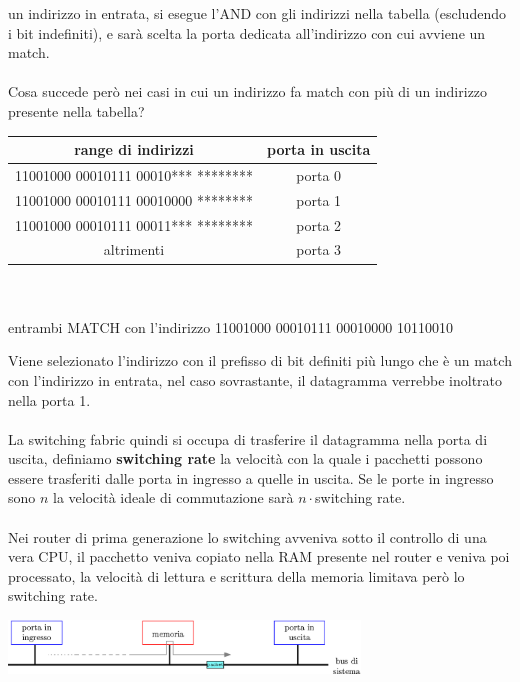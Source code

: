 \documentclass[12pt, letterpaper]{article}
\newcommand{\acc}{\\\hphantom{}\\}
\begin{document}
un indirizzo in entrata, si esegue l'AND con gli indirizzi nella tabella (escludendo i bit indefiniti), e sarà scelta 
la porta dedicata all'indirizzo con cui avviene un match. \acc 
Cosa succede però nei casi in cui un indirizzo fa match con più di un indirizzo presente nella tabella?
\begin{center}
    \begin{tabular}{|c|c|}
        \hline
        \rowcolor[HTML]{C0C0C0} 
        \textbf{range di indirizzi}                                   & \textbf{porta in uscita}        \\ \hline
        \rowcolor[HTML]{FFFFFF} 
        {\color[HTML]{FE0000} 11001000  00010111  00010***  ********} & \cellcolor[HTML]{FFFFFF}porta 0 \\ \hline
        \rowcolor[HTML]{FFFFFF} 
        {\color[HTML]{FE0000} 11001000  00010111  00010000  ********} & porta 1                         \\ \hline
        \rowcolor[HTML]{FFFFFF} 
        {\color[HTML]{000000} 11001000  00010111  00011***  ********} & \cellcolor[HTML]{FFFFFF}porta 2 \\ \hline
        altrimenti                                                    & porta 3                         \\ \hline
        \end{tabular}\acc
        entrambi \color{red}MATCH \color{black}  con l'indirizzo 11001000  00010111  00010000 10110010
\end{center}
Viene selezionato l'indirizzo con il prefisso di bit definiti più lungo che è un match con l'indirizzo in entrata, nel 
caso sovrastante, il datagramma verrebbe inoltrato nella porta 1. \acc 
La switching fabric quindi si occupa di trasferire il datagramma nella porta di uscita, definiamo \textbf{switching rate} 
la velocità con la quale i pacchetti possono essere trasferiti dalle porta in ingresso a quelle in uscita. Se le porte in ingresso 
sono $n$ la velocità ideale di commutazione sarà $n\cdot $switching rate.\acc  
Nei router di prima generazione lo switching avveniva sotto il controllo di una vera CPU, il pacchetto veniva copiato nella 
RAM presente nel router e veniva poi processato, la velocità di lettura e scrittura della memoria limitava però lo 
switching rate.\begin{center}
    \includegraphics[width=0.7\textwidth ]{images/fabricMem.eps}
\end{center}
\end{document}
